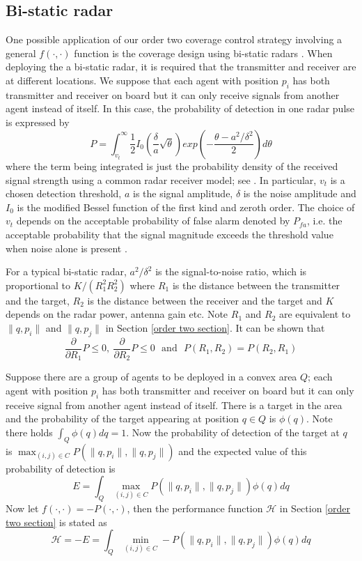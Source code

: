 \documentclass[letterpaper, 10 pt, conference]{ieeeconf}
\begin{document}
\subsection{Bi-static radar}
One possible application of our order two coverage control strategy involving a general $f(\cdot,\cdot)$ function is the coverage design using bi-static radars \cite{nezlin2007bistatic}. When deploying the a bi-static radar, it is required that the transmitter and receiver are at different locations. We suppose that each agent with position $p_i$ has both transmitter and receiver on board but it can only receive signals from another agent instead of itself. In this case, the probability of detection in one radar pulse is expressed by
\begin{equation}
\label{}
P=\int_{v_t}^\infty \frac{1}{2}I_0(\frac{\delta}{a}\sqrt{\theta})exp(-\frac{\theta-a^2/\delta^2}{2})d\theta
\end{equation}
where the term being integrated is just the probability density of the received signal strength using a common radar receiver model; see \cite{mahafza2013radar}. In particular, $v_t$ is a chosen detection threshold, $a$ is the signal amplitude, $\delta$ is the noise amplitude and $I_0$ is the modified Bessel function of the first kind and zeroth order.
The choice of $v_t$ depends on the acceptable probability of false alarm denoted by $P_{fa}$, i.e. the acceptable probability that the signal magnitude exceeds the threshold value when noise alone is present \cite{mahafza2013radar}.

For a typical bi-static radar, $a^2/\delta^2$ is the signal-to-noise ratio, which is proportional to $K/(R_1^2 R_2^2)$ where $R_1$ is the distance between the transmitter and the target, $R_2$ is the distance between the receiver and the target and $K$ depends on the radar power, antenna gain etc. Note $R_1$ and $R_2$ are equivalent to $\|q,p_i\|$ and $\|q,p_j\|$ in Section \ref{order two section}. It can be shown that
$$\frac{\partial}{\partial R_1}P \leq 0,~\frac{\partial}{\partial R_2}P \leq 0\,\,\,\,\text{and}\,\,\,\, P(R_1,R_2)=P(R_2,R_1)$$

Suppose there are a group of agents to be deployed in a convex area $Q$;  each agent with position $p_i$ has both transmitter and receiver on board but it can only receive signal from another agent instead of itself.
There is a target in the area and the probability of the target appearing at position $q\in Q$ is $\phi(q)$. Note there holds $\int_Q \phi(q)dq=1$. Now the probability of detection of the target at $q$ is $\max_{(i,j)\in C} P(\|q,p_i\|,\|q,p_j\|)$ and the expected value of this probability of detection is
$$E=\int_Q \max_{(i,j)\in C} P(\|q,p_i\|,\|q,p_j\|) \phi(q) dq$$
Now let $f(\cdot,\cdot)=-P(\cdot,\cdot)$, then the performance function $\mathcal{H}$ in Section \ref{order two section} is stated as
$$\mathcal{H}=-E=\int_Q \min_{(i,j)\in C} -P(\|q,p_i\|,\|q,p_j\|) \phi(q) dq$$
\end{document}

